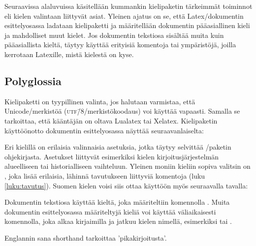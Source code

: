 Seuraavissa alaluvuissa käsitellään kummankin kielipaketin tärkeimmät
toiminnot eli kielen valintaan liittyvät asiat. Yleinen ajatus on se,
että Latex\-/dokumentin esittelyosassa ladataan kielipaketti ja
määritellään dokumentin pääasiallinen kieli ja mahdolliset muut kielet.
Jos dokumentin tekstiosa sisältää muita kuin pääasiallista kieltä,
täytyy käyttää erityisiä komentoja tai ympäristöjä, joilla kerrotaan
Latexille, mistä kielestä on kyse.

\subsection{Polyglossia}

Kielipaketti  on tyypillinen valinta, jos halutaan
varmistaa, että Unicode\-/merkistöä (\textsc{utf\=/8}\-/merkistökoodaus)
voi käyttää vapaasti. Samalla se tarkoittaa, että kääntäjän on oltava
Lualatex tai Xelatex. Kielipaketin käyttöönotto dokumentin
esittelyosassa näyttää seuraavanlaiselta:

\begin{koodilohkosis}
  \usepackage{polyglossia}
  \setdefaultlanguage{finnish}
\end{koodilohkosis}

Eri kielillä on erilaisia valinnaisia asetuksia, jotka täytyy selvittää
\-/paketin ohjekirjasta. Asetukset liittyvät
esimerkiksi kielen kirjoitusjärjestelmän alueelliseen tai
historialliseen vaihteluun. Yleinen moniin kieliin sopiva valitsin on
, joka lisää erilaisia, lähinnä tavutukseen
liittyviä komentoja (luku \ref{luku:tavutus}). Suomen kielen voisi siis
ottaa käyttöön myös seuraavalla tavalla:

\begin{koodilohkosis}
  \setdefaultlanguage[babelshorthands]{finnish}
\end{koodilohkosis}

Dokumentin tekstiosa käyttää kieltä, joka määriteltiin komennolla
. Muita dokumentin esittelyosassa
määriteltyjä kieliä voi käyttää väliaikaisesti komennolla, joka alkaa
kirjaimilla  ja jatkuu kielen nimellä, esimerkiksi
 tai .

\begin{koodilohkosis}
  Englannin sana \textenglish{shorthand} tarkoittaa 'pikakirjoitusta'.
\end{koodilohkosis}

